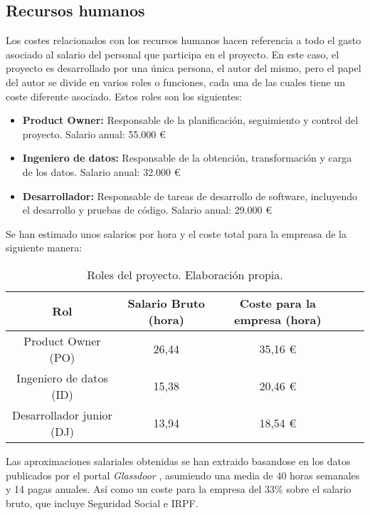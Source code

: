 \subsection{Recursos humanos}

Los costes relacionados con los recursos humanos hacen referencia a todo el gasto asociado al salario del personal que participa en el proyecto. 
En este caso, el proyecto es desarrollado por una única persona, el autor del mismo, pero el papel del autor se divide en varios roles o funciones, 
cada una de las cuales tiene un coste diferente asociado. Estos roles son los siguientes:
\begin{itemize}
    \item  \textbf{Product Owner:} Responsable de la planificación, seguimiento y control del proyecto. Salario anual: 55.000 €
    \item  \textbf{Ingeniero de datos:} Responsable de la obtención, transformación y carga de los datos. Salario anual: 32.000 €
    \item  \textbf{Desarrollador:} Responsable de tareas de desarrollo de software, incluyendo el desarrollo y pruebas de código. Salario anual: 29.000 €
\end{itemize}

Se han estimado unos salarios por hora y el coste total para la empreasa de la siguiente manera:

\begin{table}[H]
    \centering
    \begin{tabular}{|c|c|c|c|c|}
        \hline
        \textbf{Rol} & \textbf{Salario Bruto (hora)} & \textbf{Coste para la empresa (hora)}\\
        \hline
        Product Owner (PO) & 26,44 & 35,16 € \\
        Ingeniero de datos (ID) & 15,38 & 20,46 € \\
        Desarrollador junior (DJ) & 13,94 & 18,54  € \\
        \hline
    \end{tabular}
    \caption{Roles del proyecto. Elaboración propia.}
    \label{tab:estimaciones}
\end{table}

Las aproximaciones salariales obtenidas se han extraido basandose en los datos publicados por el portal \textit{Glassdoor} \cite{glassdoor}, 
asumiendo una media de 40 horas semanales y 14 pagas anuales. Así como un coste para la empresa del 33\% sobre el salario bruto, que incluye Seguridad Social e IRPF.

